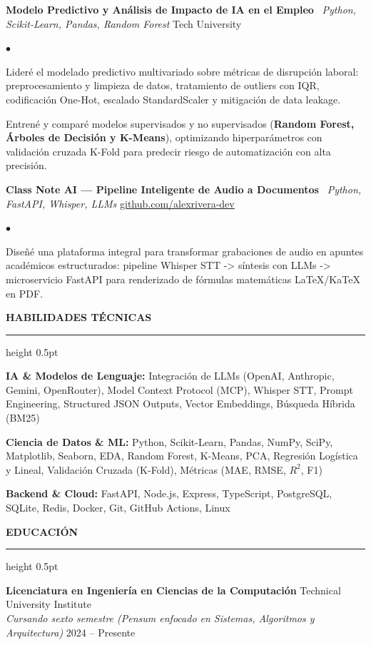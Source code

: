 \documentclass[10pt,letterpaper]{article}
\newcommand{\resumesection}[1]{%
  \vspace{2pt}%
  {\color{primary}\normalsize\bfseries\MakeUppercase{#1}}%
  \vspace{1pt}\hrule height 0.5pt\vspace{2pt}%
}
\renewenvironment{itemize}{%
  \begin{list}{\color{primary}$\bullet$}{%
    \setlength{\leftmargin}{1.1em}%
    \setlength{\itemsep}{0.5pt}%
    \setlength{\topsep}{1pt}%
    \setlength{\parsep}{0pt}%
    \setlength{\partopsep}{0pt}%
  }%
}{%
  \end{list}%
}
\newenvironment{skilllist}{%
  \begin{list}{}{%
    \setlength{\leftmargin}{0pt}%
    \setlength{\itemsep}{0.5pt}%
    \setlength{\topsep}{1pt}%
    \setlength{\parsep}{0pt}%
    \setlength{\partopsep}{0pt}%
  }%
}{%
  \end{list}%
}
\begin{document}
\textbf{Modelo Predictivo y Análisis de Impacto de IA en el Empleo} \textbar\ \textit{Python, Scikit-Learn, Pandas, Random Forest} \hfill Tech University
\begin{itemize}
    \item Lideré el modelado predictivo multivariado sobre métricas de disrupción laboral: preprocesamiento y limpieza de datos, tratamiento de outliers con IQR, codificación One-Hot, escalado StandardScaler y mitigación de data leakage.
    \item Entrené y comparé modelos supervisados y no supervisados (\textbf{Random Forest, Árboles de Decisión y K-Means}), optimizando hiperparámetros con validación cruzada K-Fold para predecir riesgo de automatización con alta precisión.
\end{itemize}

\vspace{1pt}

\textbf{Class Note AI — Pipeline Inteligente de Audio a Documentos} \textbar\ \textit{Python, FastAPI, Whisper, LLMs} \hfill \href{https://github.com/alexrivera-dev}{github.com/alexrivera-dev}
\begin{itemize}
    \item Diseñé una plataforma integral para transformar grabaciones de audio en apuntes académicos estructurados: pipeline Whisper STT -> síntesis con LLMs -> microservicio FastAPI para renderizado de fórmulas matemáticas LaTeX/KaTeX en PDF.
\end{itemize}

\resumesection{Habilidades Técnicas}
\begin{skilllist}
    \item \textbf{IA \& Modelos de Lenguaje:} Integración de LLMs (OpenAI, Anthropic, Gemini, OpenRouter), Model Context Protocol (MCP), Whisper STT, Prompt Engineering, Structured JSON Outputs, Vector Embeddings, Búsqueda Híbrida (BM25)
    \item \textbf{Ciencia de Datos \& ML:} Python, Scikit-Learn, Pandas, NumPy, SciPy, Matplotlib, Seaborn, EDA, Random Forest, K-Means, PCA, Regresión Logística y Lineal, Validación Cruzada (K-Fold), Métricas (MAE, RMSE, $R^2$, F1)
    \item \textbf{Backend \& Cloud:} FastAPI, Node.js, Express, TypeScript, PostgreSQL, SQLite, Redis, Docker, Git, GitHub Actions, Linux
\end{skilllist}

\resumesection{Educación}
\textbf{Licenciatura en Ingeniería en Ciencias de la Computación} \hfill Technical University Institute \\
\textit{Cursando sexto semestre (Pensum enfocado en Sistemas, Algoritmos y Arquitectura)} \hfill 2024 -- Presente
\end{document}
